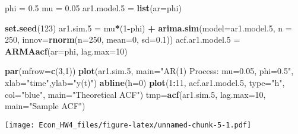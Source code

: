 \documentclass[]{article}
\newenvironment{Shaded}{\begin{snugshade}}{\end{snugshade}}
\newcommand{\KeywordTok}[1]{\textcolor[rgb]{0.13,0.29,0.53}{\textbf{#1}}}
\newcommand{\DataTypeTok}[1]{\textcolor[rgb]{0.13,0.29,0.53}{#1}}
\newcommand{\DecValTok}[1]{\textcolor[rgb]{0.00,0.00,0.81}{#1}}
\newcommand{\FloatTok}[1]{\textcolor[rgb]{0.00,0.00,0.81}{#1}}
\newcommand{\StringTok}[1]{\textcolor[rgb]{0.31,0.60,0.02}{#1}}
\newcommand{\OperatorTok}[1]{\textcolor[rgb]{0.81,0.36,0.00}{\textbf{#1}}}
\newcommand{\NormalTok}[1]{#1}
\begin{document}
\begin{Shaded}
\begin{Highlighting}[]
\NormalTok{phi =}\StringTok{ }\FloatTok{0.5}
\NormalTok{mu  =}\StringTok{ }\FloatTok{0.05}
\NormalTok{ar1.model.}\DecValTok{5}\NormalTok{ =}\StringTok{ }\KeywordTok{list}\NormalTok{(}\DataTypeTok{ar=}\NormalTok{phi)}

\KeywordTok{set.seed}\NormalTok{(}\DecValTok{123}\NormalTok{)}
\NormalTok{ar1.sim.}\DecValTok{5}\NormalTok{ =}\StringTok{ }\NormalTok{mu}\OperatorTok{*}\NormalTok{(}\DecValTok{1}\OperatorTok{-}\NormalTok{phi) }\OperatorTok{+}\StringTok{ }\KeywordTok{arima.sim}\NormalTok{(}\DataTypeTok{model=}\NormalTok{ar1.model.}\DecValTok{5}\NormalTok{, }\DataTypeTok{n =} \DecValTok{250}\NormalTok{,}
                             \DataTypeTok{innov=}\KeywordTok{rnorm}\NormalTok{(}\DataTypeTok{n=}\DecValTok{250}\NormalTok{, }\DataTypeTok{mean=}\DecValTok{0}\NormalTok{, }\DataTypeTok{sd=}\FloatTok{0.1}\NormalTok{))}
\NormalTok{acf.ar1.model.}\DecValTok{5}\NormalTok{ =}\StringTok{ }\KeywordTok{ARMAacf}\NormalTok{(}\DataTypeTok{ar=}\NormalTok{phi, }\DataTypeTok{lag.max=}\DecValTok{10}\NormalTok{)}

\KeywordTok{par}\NormalTok{(}\DataTypeTok{mfrow=}\KeywordTok{c}\NormalTok{(}\DecValTok{3}\NormalTok{,}\DecValTok{1}\NormalTok{))}
    \KeywordTok{plot}\NormalTok{(ar1.sim.}\DecValTok{5}\NormalTok{, }\DataTypeTok{main=}\StringTok{"AR(1) Process: mu=0.05, phi=0.5"}\NormalTok{,}
           \DataTypeTok{xlab=}\StringTok{"time"}\NormalTok{,}\DataTypeTok{ylab=}\StringTok{"y(t)"}\NormalTok{)}
    \KeywordTok{abline}\NormalTok{(}\DataTypeTok{h=}\DecValTok{0}\NormalTok{)}
    \KeywordTok{plot}\NormalTok{(}\DecValTok{1}\OperatorTok{:}\DecValTok{11}\NormalTok{, acf.ar1.model.}\DecValTok{5}\NormalTok{, }\DataTypeTok{type=}\StringTok{"h"}\NormalTok{, }\DataTypeTok{col=}\StringTok{"blue"}\NormalTok{, }\DataTypeTok{main=}\StringTok{"Theoretical ACF"}\NormalTok{)}
\NormalTok{    tmp=}\KeywordTok{acf}\NormalTok{(ar1.sim.}\DecValTok{5}\NormalTok{, }\DataTypeTok{lag.max=}\DecValTok{10}\NormalTok{, }\DataTypeTok{main=}\StringTok{"Sample ACF"}\NormalTok{)}
\end{Highlighting}
\end{Shaded}

\texttt{[image: Econ\_HW4\_files/figure-latex/unnamed-chunk-5-1.pdf]}
\end{document}
